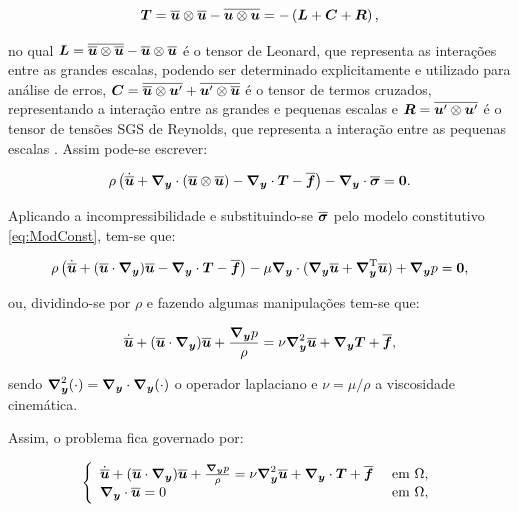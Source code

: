 \begin{equation}
    \BB{T}=\BBB{u}\otimes\BBB{u}-\overline{\BB{u}\otimes\BB{u}}=-\bigpar{\BB{L}+\BB{C}+\BB{R}}\text{,}
\end{equation}

\noindent no qual $\BB{L}=\overline{\BBB{u}\otimes\BBB{u}}-\BBB{u}\otimes\BBB{u}$ é o tensor de Leonard, que representa as interações entre as grandes escalas, podendo ser determinado explicitamente e utilizado para análise de erros, $\BB{C}=\overline{\BBB{u}\otimes\BB{u}'}+\overline{\BB{u}'\otimes\BBB{u}}$ é o tensor de termos cruzados, representando a interação entre as grandes e pequenas escalas e $\BB{R}=\overline{\BB{u}'\otimes\BB{u}'}$ é o tensor de tensões SGS de Reynolds, que representa a interação entre as pequenas escalas \cite{piomelli1999large}. Assim pode-se escrever:

\begin{equation}
    \rho\bigpar{\dot{\BBB{u}}+\Ny\cdot(\BBB{u}\otimes\BBB{u})-\Ny\cdot\BB{T}-\BBB{f}}-\Ny\cdot\bar{\tens}=\BB{0}\text{.}
\end{equation}

Aplicando a incompressibilidade e substituindo-se $\bar{\tens}$ pelo modelo constitutivo \eqref{eq:ModConst}, tem-se que:

\begin{equation}
    \rho\bigpar{\dot{\BBB{u}}+(\BBB{u}\cdot\Ny)\BBB{u}-\Ny\cdot\BB{T}-\BBB{f}}-\mu\Ny\cdot(\Ny\BBB{u}+\NyT\BBB{u})+\Ny p=\BB{0}\text{,}\label{eq:ConMasLES}
\end{equation}

\noindent ou, dividindo-se por $\rho$ e fazendo algumas manipulações tem-se que:

\begin{equation}
    \dot{\BBB{u}}+(\BBB{u}\cdot\Ny)\BBB{u}+\frac{\Ny p}{\rho}=\nu\Lapl\BBB{u}+\Ny\BB{T}+\BBB{f}\text{,}
\end{equation}

\noindent sendo $\Lapl(\cdot)=\Ny\cdot\Ny(\cdot)$ o operador laplaciano e $\nu=\mu/\rho$ a viscosidade cinemática.

Assim, o problema fica governado por:

\begin{equation}
    \left\{
    \begin{array}{ll}
        \dot{\BBB{u}}+(\BBB{u}\cdot\Ny)\BBB{u}+\frac{\Ny p}{\rho}=\nu\Lapl\BBB{u}+\Ny\cdot\BB{T}+\BBB{f} & \text{ em }\Omega\text{,} \\
        \Ny\cdot\BBB{u}=0                                                                                & \text{ em }\Omega\text{,}
    \end{array}
    \right.
\end{equation}

